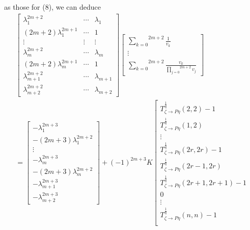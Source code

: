 \documentclass[journal,a4paper,12pt,onecolumn]{IEEEtran}
\begin{document}
as those for (8), we can deduce\begin{multline*}
\left[
\begin{array}{ccc}
\lambda _{1}^{2m+2} & \cdots & \lambda _{1} \\
\left( 2m+2\right) \lambda _{1}^{2m+1} & \cdots & 1 \\
\vdots & \vdots & \vdots \\
\lambda _{m}^{2m+2} & \cdots & \lambda _{m} \\
\left( 2m+2\right) \lambda _{m}^{2m+1} & \cdots & 1 \\
\lambda _{m+1}^{2m+2} & \cdots & \lambda _{m+1} \\
\lambda _{m+2}^{2m+2} & \cdots & \lambda _{m+2}\end{array}\right] \left[
\begin{array}{c}
\overset{2m+2}{\underset{k=0}{\sum }}\frac{1}{v_{k}} \\
\overset{}{\underset{}{\vdots }} \\
\overset{2m+2}{\underset{k=0}{\sum }}\frac{v_{k}}{\overset{2m+2}{\underset{j=0}{\prod }}v_{j}}\end{array}\right] \\
=\left[
\begin{array}{c}
-\lambda _{1}^{2m+3} \\
-\left( 2m+3\right) \lambda _{1}^{2m+2} \\
\vdots \\
-\lambda _{m}^{2m+3} \\
-\left( 2m+3\right) \lambda _{m}^{2m+2} \\
-\lambda _{m+1}^{2m+3} \\
-\lambda _{m+2}^{2m+3}\end{array}\right] +\left( -1\right) ^{2m+3}K\left[
\begin{array}{c}
T_{\zeta \rightarrow P\eta }^{\frac{1}{q}}\left( 2,2\right) -1 \\
T_{\zeta \rightarrow P\eta }^{\frac{1}{q}}\left( 1,2\right) \\
\vdots \\
T_{\zeta \rightarrow P\eta }^{\frac{1}{q}}\left( 2r,2r\right) -1 \\
T_{\zeta \rightarrow P\eta }^{\frac{1}{q}}\left( 2r-1,2r\right) \\
T_{\zeta \rightarrow P\eta }^{\frac{1}{q}}\left( 2r+1,2r+1\right) -1 \\
0 \\
\vdots \\
T_{\zeta \rightarrow P\eta }^{\frac{1}{q}}\left( n,n\right) -1 \\

\end{array}
\end{multline*}
\end{document}
